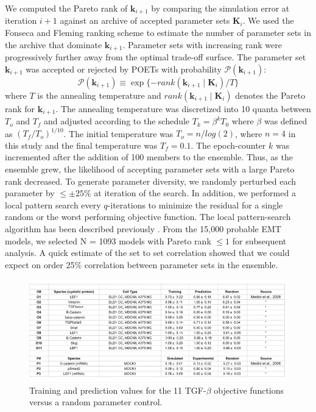 \documentclass[12pt]{article}
\begin{document}
We computed the Pareto rank of $\mathbf{k}_{i+1}$ by comparing the simulation error at iteration $i+1$ against an archive of accepted parameter sets $\mathbf{K}_{i}$.
We used the Fonseca and Fleming ranking scheme \cite{fonseca1993genetic} to estimate the number of parameter sets in the archive that dominate
$\mathbf{k}_{i+1}$. Parameter sets with increasing rank were progressively further away from the optimal trade-off surface.
The parameter set $\mathbf{k}_{i+1}$ was accepted or rejected by POETs with probability $\mathcal{P}\left(\mathbf{k}_{i+1}\right)$:
\begin{equation}\label{eqn_costMOSA}
\mathcal{P}(\mathbf{k}_{i+1}) \equiv \exp{\{-rank\left(\mathbf{k}_{i+1} \mid \mathbf{K}_{i} \right)/T\}}
\end{equation}
where $T$ is the annealing temperature and $rank\left(\mathbf{k}_{i+1} \mid \mathbf{K}_{i} \right)$ denotes the Pareto rank for $\mathbf{k}_{i+1}$.
The annealing temperature was discretized into 10 quanta between $T_{o}$ and $T_{f}$ and adjusted according to the schedule
$T_k = \beta^k T_0$ where $\beta$ was defined as $\left({T_{f}}/{T_{o}}\right)^{1/10}$.
The initial temperature was $T_{o} = \mathit{n}/log(2)$, where $n = 4$ in this study and the final temperature was $T_{f} = 0.1$.
The epoch-counter $k$ was incremented after the addition of 100 members to the ensemble.
Thus, as the ensemble grew, the likelihood of accepting parameter sets with a large Pareto rank decreased.
To generate parameter diversity, we randomly perturbed each parameter by $\leq\pm25\%$ at iteration of the search.
In addition, we performed a local pattern search every $q$-iterations to minimize the residual for a single random or the worst performing objective function.
The local pattern-search algorithm has been described previously \cite{gadkar2003cybernetic}.
From the 15,000 probable EMT models, we selected N = 1093 models with Pareto rank $\leq{1}$ for subsequent analysis.
A quick estimate of the set to set correlation showed that we could expect on order 25\% correlation between parameter sets in the ensemble.

\begin{figure}
\includegraphics [width=1.0\linewidth] {./figs/Fig-5-Supplemental-ErrorTable.pdf}
\caption{Training and prediction values for the 11 TGF-$\beta$ objective functions versus a random parameter control.}\label{fig:S5}
\end{figure}
\end{document}

